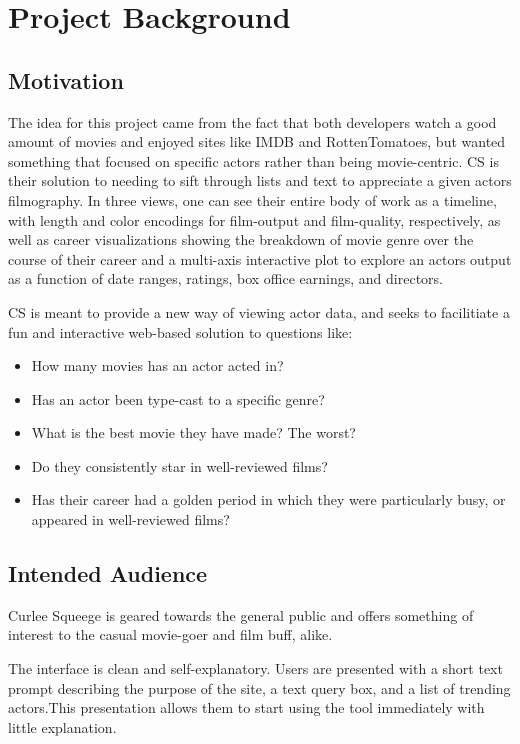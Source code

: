 \documentclass[12pt]{article}
\begin{document}
\newpage

\section{Project Background}

\subsection{Motivation}\label{sec:Motivation}
	The idea for this project came from the fact that both developers watch a good amount of movies and enjoyed sites like IMDB and RottenTomatoes, but wanted something that focused on specific actors rather than being movie-centric. CS is their solution to needing to sift through lists and text to appreciate a given actors filmography. In three views, one can see their entire body of work as a timeline, with length and color encodings for film-output and film-quality, respectively, as well as career visualizations showing the breakdown of movie genre over the course of their career and a multi-axis interactive plot to explore an actors output as a function of date ranges, ratings, box office earnings, and directors.
	
	CS is meant to provide a new way of viewing actor data, and seeks to facilitiate a fun and interactive web-based solution to questions like:


	\begin{itemize}
		\item How many movies has an actor acted in?
		\item Has an actor been type-cast to a specific genre?
		\item What is the best movie they have made? The worst?
		\item Do they consistently star in well-reviewed films?
		\item Has their career had a golden period in which they were particularly busy, or appeared in well-reviewed films?
	\end{itemize}
	
\subsection{Intended Audience}
Curlee Squeege is geared towards the general public and offers something of interest to the casual movie-goer  and film buff, alike.  

The interface is clean and self-explanatory.  
Users are presented with a short text prompt describing the purpose of the site, a text query box, and a list of trending actors.This presentation allows them to start using the tool immediately with little explanation.
\end{document}
